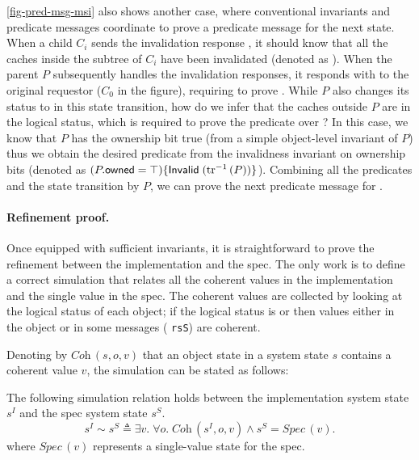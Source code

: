 \documentclass[sigplan,10pt,review,anonymous,screen]{acmart}\settopmatter{printfolios=true,printccs=false,printacmref=false}
\def\slstinline{\lstinline[basicstyle=\ttfamily\small]}
\begin{document}
\autoref{fig-pred-msg-msi} also shows another case, where conventional invariants and predicate messages coordinate to prove a predicate message for the next state.
When a child $C_i$ sends the invalidation response , it should know that all the caches inside the subtree of $C_i$ have been invalidated (denoted as {\color{myblue} }).
When the parent $P$ subsequently handles the invalidation responses, it responds with  to the original requestor ($C_0$ in the figure), requiring to prove {\color{myred} }.
While $P$ also changes its status to \stI{} in this state transition, how do we infer that the caches outside $P$ are in the logical \stI{} status, which is required to prove the predicate over {\color{myred} }?
In this case, we know that $P$ has the ownership bit true (from a simple object-level invariant of $P$) thus we obtain the desired predicate from the invalidness invariant on ownership bits (denoted as {\color{myblue} $(P.\textsf{owned} = \top)\{\textsf{Invalid}\;(\textrm{tr}^{-1}\,(P))\}$}).
Combining all the predicates and the state transition by $P$, we can prove the next predicate message for {\color{myred} }.

\paragraph{Refinement proof.}

\newcommand{\implcoh}[3]{\ensuremath{\textit{Coh}\,(#1, #2, #3)}}
\newcommand{\speccoh}[1]{\ensuremath{\textit{Spec}\,(v)}}

Once equipped with sufficient invariants, it is straightforward to prove the refinement between the implementation and the spec.
The only work is to define a correct simulation that relates all the coherent values in the implementation and the single value in the spec.
The coherent values are collected by looking at the logical status of each object; if the logical status is \stS{} or \stM{} then values either in the object or in some messages (\eg{} \slstinline{rsS}) are coherent.

Denoting by $\implcoh{s}{o}{v}$ that an object state in a system state $s$ contains a coherent value $v$, the simulation can be stated as follows:
\begin{theorem}
  The following simulation relation holds between the implementation system state $s^I$ and the spec system state $s^S$.
  \begin{displaymath}
    s^I \sim s^S \triangleq \exists v.\; \forall o.\; \implcoh{s^I}{o}{v} \wedge s^S = \speccoh{v}.
  \end{displaymath}
  where $\speccoh{v}$ represents a single-value state for the spec.
  \label{thm-msi-correct}
\end{theorem}
\end{document}

